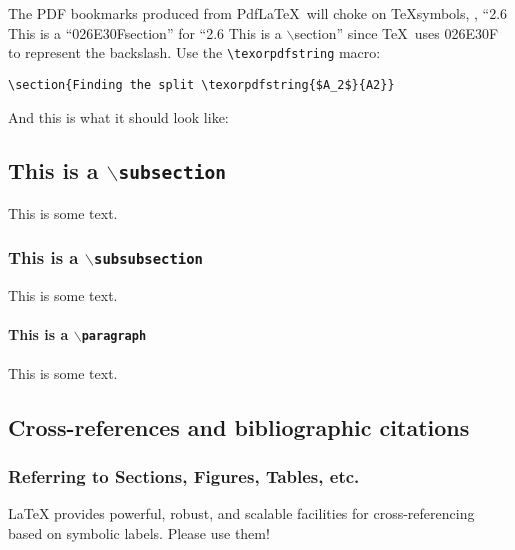 The PDF bookmarks produced from Pdf\LaTeX\ will choke on \TeX symbols,
\eg, ``2.6 This is a
``026E30Fsection'' for ``2.6 This is a $\backslash$section'' since \TeX\ uses 026E30F to represent the backslash. Use the
\verb+\texorpdfstring+ macro:
\begin{verbatim}
\section{Finding the split \texorpdfstring{$A_2$}{A2}}
\end{verbatim}

And this is what it should look like:

\subsection{This is a \texorpdfstring{$\backslash$\texttt{subsection}}{subsection}}
This is some text.

\subsubsection{This is a \texorpdfstring{$\backslash$\texttt{subsubsection}}{subsubsection}}
This is some text.


\paragraph{This is a \texorpdfstring{$\backslash$\texttt{paragraph}}{paragraph}}
This is some text.





\subsection{Cross-references and bibliographic citations}

\subsubsection{Referring to Sections, Figures, Tables, etc.}
\texorpdfstring{\LaTeX}{LaTeX} provides powerful, robust, and scalable facilities for
cross-referencing based on symbolic labels.
Please use them!

